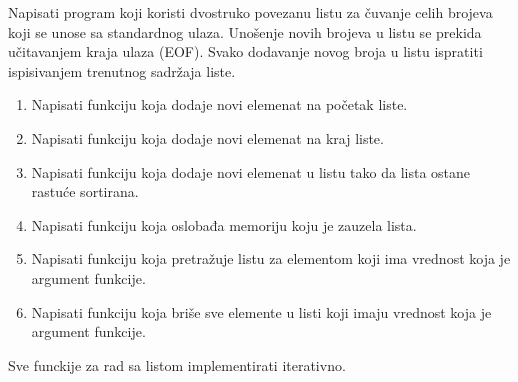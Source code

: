 \iffalse
\begin{Exercise}[label=602]
Prethodni zadatak uraditi tako da sve funkcije za rad sa listom budu rekurzivne.
\end{Exercise}
\begin{Answer}[ref=602]
\includecode{resenja/06_Liste/601.c}
\end{Answer}
\fi

\begin{Exercise}[label=603]
Napisati program koji koristi dvostruko povezanu listu za čuvanje
celih brojeva koji se unose sa standardnog ulaza. 
Unošenje novih brojeva u listu se prekida učitavanjem kraja ulaza (EOF). 
Svako dodavanje novog broja u listu ispratiti ispisivanjem trenutnog sadržaja liste. 
\begin{enumerate}
 \item Napisati funkciju koja dodaje novi elemenat na početak liste.
 \item Napisati funkciju koja dodaje novi elemenat na kraj liste.
 \item Napisati funkciju koja dodaje novi elemenat u listu tako da lista ostane rastuće sortirana.
 \item Napisati funkciju koja oslobađa memoriju koju je zauzela lista.
 \item Napisati funkciju koja pretražuje listu za elementom koji ima vrednost koja je argument funkcije.
 \item Napisati funkciju koja briše sve elemente u listi koji imaju vrednost koja je argument funkcije.
\end{enumerate}
Sve funckije za rad sa listom implementirati iterativno.
\end{Exercise}
\begin{Answer}[ref=603]
\end{Answer}



